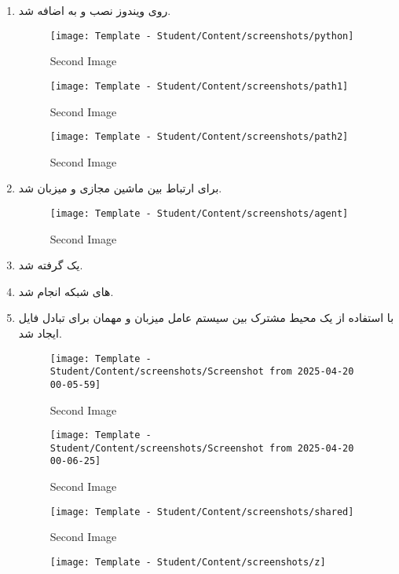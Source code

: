 \begin{enumerate}
\item {} روی ویندوز نصب و به  اضافه شد.
\begin{figure}[htbp]
      \centering
      \texttt{[image: Template - Student/Content/screenshots/python]}
      \caption{Second Image}
      \label{fig:vert2}
\end{figure}
\begin{figure}[htbp]
      \centering
      \texttt{[image: Template - Student/Content/screenshots/path1]}
      \caption{Second Image}
      \label{fig:vert2}
\end{figure}
\begin{figure}[htbp]
      \centering
      \texttt{[image: Template - Student/Content/screenshots/path2]}
      \caption{Second Image}
      \label{fig:vert2}
\end{figure}
\item {} برای ارتباط بین ماشین مجازی و میزبان  شد.
\begin{figure}[htbp]
      \centering
      \texttt{[image: Template - Student/Content/screenshots/agent]}
      \caption{Second Image}
      \label{fig:vert2}
\end{figure}
\item یک  گرفته شد.
\item {} های شبکه انجام شد.
\item با استفاده از  یک محیط مشترک بین سیستم عامل میزبان و مهمان برای تبادل فایل ایجاد شد.
\begin{figure}[htbp]
      \centering
      \texttt{[image: Template - Student/Content/screenshots/Screenshot from 2025-04-20 00-05-59]}
      \caption{Second Image}
      \label{fig:vert2}
\end{figure}
\begin{figure}[htbp]
      \centering
      \texttt{[image: Template - Student/Content/screenshots/Screenshot from 2025-04-20 00-06-25]}
      \caption{Second Image}
      \label{fig:vert2}
\end{figure}
\begin{figure}[htbp]
      \centering
      \texttt{[image: Template - Student/Content/screenshots/shared]}
      \caption{Second Image}
      \label{fig:vert2}
\end{figure}
\begin{figure}[htbp]
      \centering
      \texttt{[image: Template - Student/Content/screenshots/z]}

\end{figure}
\end{enumerate}
